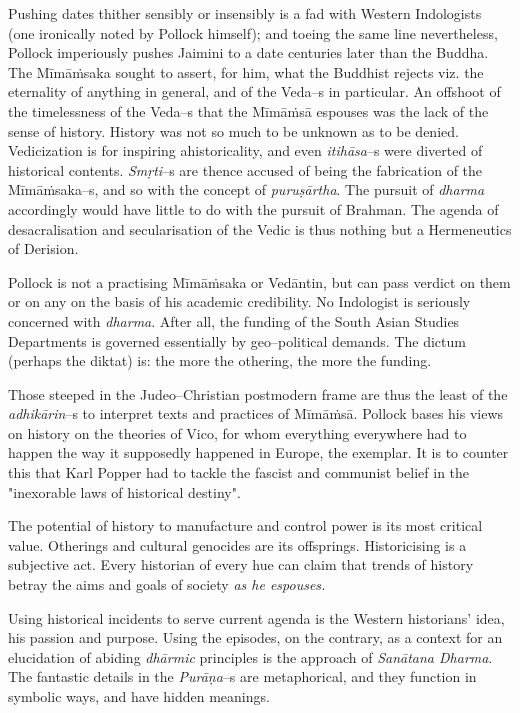 Pushing dates thither sensibly or insensibly is a fad with Western Indologists (one ironically noted by Pollock himself); and toeing the same line nevertheless, Pollock imperiously pushes Jaimini to a date centuries later than the Buddha. The Mīmāṁsaka sought to assert, for him, what the Buddhist rejects viz. the eternality of anything in general, and of the Veda–s in particular. An offshoot of the timelessness of the Veda–s that the Mīmāṁsā espouses was the lack of the sense of history. History was not so much to be unknown as to be denied. Vedicization is for inspiring ahistoricality, and even \textit{itihāsa}–s were diverted of historical contents. \textit{Smṛti}–s are thence accused of being the fabrication of the Mīmāṁsaka–s, and so with the concept of \textit{puruṣārtha}. The pursuit of \textit{dharma} accordingly would have little to do with the pursuit of Brahman. The agenda of desacralisation and secularisation of the Vedic is thus nothing but a Hermeneutics of Derision.

Pollock is not a practising Mīmāṁsaka or Vedāntin, but can pass verdict on them or on any on the basis of his academic credibility. No Indologist is seriously concerned with \textit{dharma}. After all, the funding of the South Asian Studies Departments is governed essentially by geo–political demands. The dictum (perhaps the diktat) is: the more the othering, the more the funding.

 Those steeped in the Judeo–Christian postmodern frame are thus the least of the \textit{adhikārin}–s to interpret texts and practices of Mīmāṁsā. Pollock bases his views on history on the theories of Vico, for whom everything everywhere had to happen the way it supposedly happened in Europe, the exemplar. It is to counter this that Karl Popper had to tackle the fascist and communist belief in the "inexorable laws of historical destiny".

 The potential of history to manufacture and control power is its most critical value. Otherings and cultural genocides are its offsprings. Historicising is a subjective act. Every historian of every hue can claim that trends of history betray the aims and goals of society \textit{as he espouses.}

Using historical incidents to serve current agenda is the Western historians’ idea, his passion and purpose. Using the episodes, on the contrary, as a context for an elucidation of abiding \textit{dhārmic} principles is the approach of \textit{Sanātana Dharma}. The fantastic details in the \textit{Purāṇa}–s are metaphorical, and they function in symbolic ways, and have hidden meanings.

